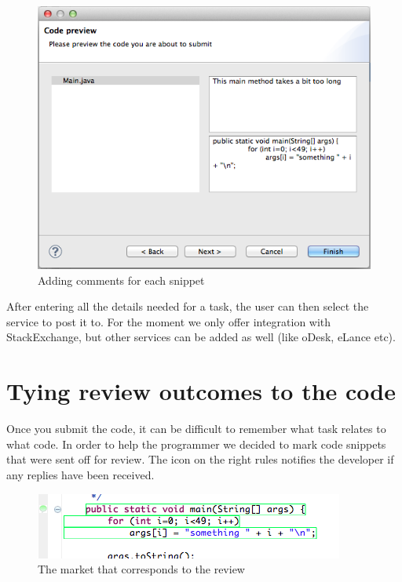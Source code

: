 \documentclass{sigchi}
\begin{document}
\begin{figure}[hbt]
	\includegraphics[width=\columnwidth]{wizard.png}
\caption{Adding comments for each snippet}
\label{fig:wizard}
\end{figure}

After entering all the details needed for a task, the user can then select the service to post it to. For the
moment we only offer integration with StackExchange, but other services can be added as well (like
oDesk, eLance etc). 

\section{Tying review outcomes to the code}

Once you submit the code, it can be difficult to remember what task relates to what code. In order to help
the programmer we decided to mark code snippets that were sent off for review. The icon on the right
rules notifies the developer if any replies have been received. 

\begin{figure}[hbt]
	\includegraphics[width=\columnwidth]{marker.png}
\caption{The market that corresponds to the review}
\label{fig:marker}
\end{figure}
\end{document}
